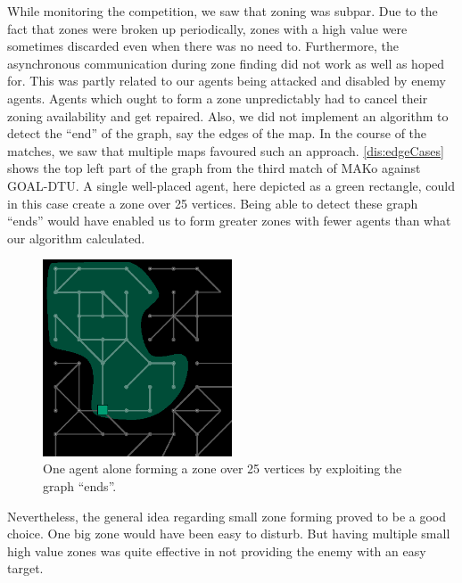 While monitoring the competition, we saw that zoning was subpar.
Due to the fact that zones were broken up periodically, zones with a high value were sometimes discarded even when there was no need to.
Furthermore, the asynchronous communication during zone finding did not work as well as hoped for.
This was partly related to our agents being attacked and disabled by enemy agents.
Agents which ought to form a zone unpredictably had to cancel their zoning availability and get repaired.
Also, we did not implement an algorithm to detect the ``end'' of the graph, say the edges of the map.
In the course of the matches, we saw that multiple maps favoured such an approach.
\autoref{dis:edgeCases} shows the top left part of the graph from the third match of MAKo against GOAL-DTU.
A single well-placed agent, here depicted as a green rectangle, could in this case create a zone over 25 vertices.
Being able to detect these graph ``ends'' would have enabled us to form greater zones with fewer agents than what our algorithm calculated.
\begin{figure}[h]
	\centering
	\includegraphics[width=0.5\textwidth]{images/resultsEdgeCase.eps}
	\caption{One agent alone forming a zone over 25 vertices by exploiting the graph ``ends''.}
	\label{dis:edgeCases}
\end{figure}
Nevertheless, the general idea regarding small zone forming proved to be a good choice.
One big zone would have been easy to disturb.
But having multiple small high value zones was quite effective in not providing the enemy with an easy target.
